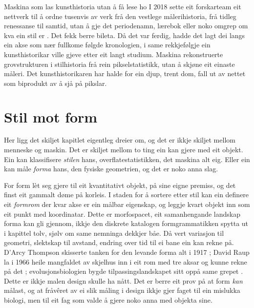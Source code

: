 \begin{kasus}{Maskina som las kunsthistoria utan å få lese ho}
I 2018 sette eit forskarteam eit nettverk til å ordne tusenvis av verk frå den vestlege målerihistoria, frå tidleg renessanse til samtid, utan å gje det periodenamn, lærebok eller noko omgrep om kva ein stil er \autocite{elgammal2018shape}. Det fekk berre bileta. Då det var ferdig, hadde det lagt dei langs ein akse som nær fullkome følgde kronologien, i same rekkjefølgje ein kunsthistorikar ville gjeve etter eit langt studium. Maskina rekonstruerte grovstrukturen i stilhistoria frå rein pikselstatistikk, utan å skjøne eit einaste måleri. Det kunsthistorikaren har halde for ein djup, trent dom, fall ut av nettet som biprodukt av å sjå på pikslar.
\end{kasus}

\section{Stil mot form}

Her ligg det skiljet kapitlet eigentleg dreier om, og det er ikkje skiljet mellom menneske og maskin. Det er skiljet mellom to ting ein kan gjere med eit objekt. Ein kan klassifisere \emph{stilen} hans, overflatestatistikken, det maskina alt eig. Eller ein kan måle \emph{forma} hans, den fysiske geometrien, og det er noko anna slag.

For form lèt seg gjere til eit kvantitativt objekt, på sine eigne premiss, og det finst eit gammalt døme på korleis. I staden for å sortere etter stil kan ein definere eit \emph{formrom} der kvar akse er ein målbar eigenskap, og leggje kvart objekt inn som eit punkt med koordinatar. Dette er morfospacet, eit samanhengande landskap forma kan gli gjennom, ikkje den diskrete katalogen formgrammatikken spytta ut i kapittel tolv, sjølv om same nemninga dekkjer båe. Då vert variasjon til geometri, slektskap til avstand, endring over tid til ei bane ein kan rekne på. D'Arcy Thompson skisserte tanken for den levande forma alt i 1917 \autocite{thompson1917growth}; David Raup la i 1966 heile mangfaldet av skjelhus inn i eit rom med tre aksar og kunne rekne på det \autocite{raup1966}; evolusjonsbiologien bygde tilpassingslandskapet sitt oppå same grepet \autocite{wright1932}. Dette er ikkje malen design skulle ha nått. Det er berre eit prov på at form \emph{kan} målast, og at fråvêret av ei slik måling i design ikkje gjer faget til ein mislukka biologi, men til eit fag som valde å gjere noko anna med objekta sine.

